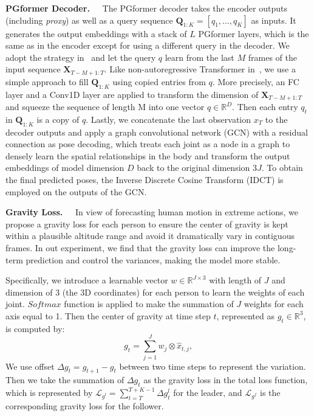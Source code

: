 \documentclass[10pt,twocolumn,letterpaper]{article}
\begin{document}
\vspace{1em}
\noindent\textbf{PGformer Decoder.~~} 
The PGformer decoder takes the encoder outputs (including \textit{proxy}) as well as a query sequence $\bm{Q}_{1:K}=[q_1, \dots, q_K]$ as inputs. 
It generates the output embeddings with a stack of $L$ PGformer layers, which is the same as in the encoder except for using a different query in the decoder.
We adopt the strategy in~\cite{guo2021multi} and let the query $q$ learn from the last $M$ frames of the input sequence $\bm{X}_{T-M+1:T}$.
Like non-autoregressive Transformer in~\cite{Martinez_potr_ICCV2021}, we use a simple approach to fill $\bm{Q}_{1:K}$ using copied entries from $q$. 
More precisely, an FC layer and a Conv1D layer are applied to transform the dimension of $\bm{X}_{T-M+1:T}$ and squeeze the sequence of length M into one vector $q \in \mathbb{R}^D$.
Then each entry $q_t$ in $\bm{Q}_{1:K}$ is a copy of $q$.
Lastly, we concatenate the last observation $x_T$ to the decoder outputs and apply a graph convolutional network (GCN) with a residual connection as pose decoding, which treats each joint as a node in a graph to densely learn the spatial relationships in the body and transform the output embeddings of model dimension $D$ back to the original dimension $3J$.
To obtain the final predicted poses, the Inverse Discrete Cosine Transform (IDCT) is employed on the outputs of the GCN.

\vspace{1em}
\noindent\textbf{Gravity Loss.~~} 
In view of forecasting human motion in extreme actions, we propose a gravity loss for each person to ensure the center of gravity is kept within a plausible altitude range and avoid it dramatically vary in contiguous frames. 
In out experiment, we find that the gravity loss can improve the long-term prediction and control the variances, making the model more stable. 

Specifically, we introduce a learnable vector $w \in \mathbb{R}^{J \times 3}$ with length of $J$ and dimension of 3 (the 3D coordinates) for each person to learn the weights of each joint. 
$Softmax$ function is applied to make the summation of $J$ weights for each axis equal to 1.
Then the center of gravity at time step $t$, represented as $g_t \in \mathbb{R}^3$, is computed by: 
\vskip -0.15in
\begin{equation}\label{eq:gravity}
    g_t = \sum_{j=1}^{J} w_j \otimes \hat{x}_{t, j}, 
\end{equation}
\vskip -0.05in
We use offset $\Delta g_t = g_{t+1} - g_{t}$ between two time steps to represent the variation. 
Then we take the summation of $\Delta g_t$ as the gravity loss in the total loss function, which is represented by $\mathcal{L}_{g^l}=\sum_{t=T}^{T+K-1} \Delta g_t^l$ for the leader, and $\mathcal{L}_{g^f}$ is the corresponding gravity loss for the follower. 
\end{document}
